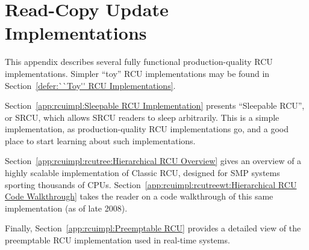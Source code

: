 
\chapter{Read-Copy Update Implementations}
\label{app:rcuimpl:Read-Copy Update Implementations}


This appendix describes several fully functional production-quality RCU
implementations.
Simpler ``toy'' RCU implementations may be found in
Section~\ref{defer:``Toy'' RCU Implementations}.

Section~\ref{app:rcuimpl:Sleepable RCU Implementation} presents
``Sleepable RCU'', or SRCU, which allows SRCU readers to sleep
arbitrarily.
This is a simple implementation, as production-quality RCU implementations
go, and a good place to start learning about such implementations.

Section~\ref{app:rcuimpl:rcutree:Hierarchical RCU Overview}
gives an overview of a highly scalable implementation of Classic
RCU, designed for SMP systems sporting thousands of CPUs.
Section~\ref{app:rcuimpl:rcutreewt:Hierarchical RCU Code Walkthrough}
takes the reader on a code walkthrough of this same implementation
(as of late 2008).

Finally,
Section~\ref{app:rcuimpl:Preemptable RCU}
provides a detailed view of the preemptable RCU implementation used
in real-time systems.


 


